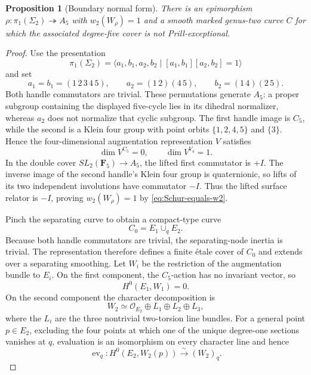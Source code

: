 \documentclass[11pt,reqno]{amsart}
\numberwithin{equation}{section}
\newtheorem{proposition}[proposition]{Proposition}
\theoremstyle{remark}
\newcommand{\cO}{\mathcal O}
\begin{document}
\begin{proposition}[Boundary normal form]
\label{prop:A5-boundary-normal-form}
There is an epimorphism
\(\rho\colon\pi_1(\Sigma_2)\twoheadrightarrow A_5\) with
\(w_2(W_\rho)=1\) and a smooth marked genus-two curve \(C\) for which
the associated degree-five cover is not Prill-exceptional.
\end{proposition}

\begin{proof}
Use the presentation
\[
 \pi_1(\Sigma_2)=
 \langle a_1,b_1,a_2,b_2\mid[a_1,b_1][a_2,b_2]=1\rangle
\]
and set
\[
 a_1=b_1=(1\,2\,3\,4\,5),\qquad
 a_2=(1\,2)(4\,5),\qquad
 b_2=(1\,4)(2\,5).
\tag{6.42}\label{eq:A5-boundary-tuple}
\]
Both handle commutators are trivial.  These permutations generate
\(A_5\): a proper subgroup containing the displayed five-cycle lies in
its dihedral normalizer, whereas \(a_2\) does not normalize that cyclic
subgroup.  The first handle image is \(C_5\), while the second is a Klein
four group with point orbits \(\{1,2,4,5\}\) and \(\{3\}\).  Hence the
four-dimensional augmentation representation \(V\) satisfies
\[
 \dim V^{C_5}=0,
 \qquad \dim V^{V_4}=1.
\tag{6.43}\label{eq:boundary-invariant-dimensions}
\]
In the double cover \(SL_2(\mathbf F_5)\to A_5\), the lifted first
commutator is \(+I\).  The inverse image of the second handle's Klein
four group is quaternionic, so lifts of its two independent involutions
have commutator \(-I\).
Thus the lifted surface relator is \(-I\), proving
\(w_2(W_\rho)=1\) by \eqref{eq:Schur-equals-w2}.

Pinch the separating curve to obtain a compact-type curve
\[
 C_0=E_1\cup_qE_2.
\]
Because both handle commutators are trivial, the separating-node inertia
is trivial.  The representation therefore defines a finite \'etale cover
of \(C_0\) and extends over a separating smoothing.  Let \(W_i\) be the
restriction of the augmentation bundle to \(E_i\).  On the first
component, the \(C_5\)-action has no invariant vector, so
\[
 H^0(E_1,W_1)=0.
\tag{6.44}\label{eq:E1-no-sections}
\]
On the second component the character decomposition is
\[
 W_2\simeq\cO_{E_2}\oplus L_1\oplus L_2\oplus L_3,
\tag{6.45}\label{eq:E2-V4-splitting}
\]
where the \(L_i\) are the three nontrivial two-torsion line bundles.
For a general point \(p\in E_2\), excluding the four points at which one
of the unique degree-one sections vanishes at \(q\), evaluation is an
isomorphism on every character line and hence
\[
 \operatorname{ev}_q\colon
 H^0(E_2,W_2(p))\xrightarrow{\sim}(W_2)_q.
\tag{6.46}\label{eq:E2-evaluation-isomorphism}
\]


\end{proof}
\end{document}
